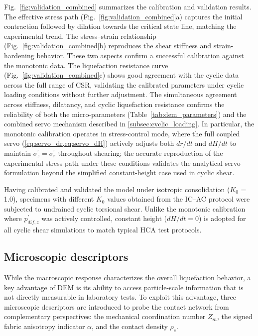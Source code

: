 \documentclass[a4paper,fleqn]{cas-sc}
\newcommand{\Kzero}{\ensuremath{K_0}}
\newcommand{\Zm}{\ensuremath{Z_m}}
\begin{document}
Fig.~\ref{fig:validation_combined} summarizes the calibration and validation results. The effective stress path (Fig.~\ref{fig:validation_combined}a) captures the initial contraction followed by dilation towards the critical state line, matching the experimental trend. The stress--strain relationship (Fig.~\ref{fig:validation_combined}b) reproduces the shear stiffness and strain-hardening behavior. These two aspects confirm a successful calibration against the monotonic data. The liquefaction resistance curve (Fig.~\ref{fig:validation_combined}c) shows good agreement with the cyclic data across the full range of CSR, validating the calibrated parameters under cyclic loading conditions without further adjustment. The simultaneous agreement across stiffness, dilatancy, and cyclic liquefaction resistance confirms the reliability of both the micro-parameters (Table~\ref{tab:dem_parameters}) and the combined servo mechanism described in \cref{subsec:cyclic_loading}. In particular, the monotonic calibration operates in stress-control mode, where the full coupled servo (\cref{eq:servo_dr,eq:servo_dH}) actively adjusts both $dr/dt$ and $dH/dt$ to maintain $\sigma_z^{\prime}=\sigma_r^{\prime}$ throughout shearing; the accurate reproduction of the experimental stress path under these conditions validates the analytical servo formulation beyond the simplified constant-height case used in cyclic shear.

Having calibrated and validated the model under isotropic consolidation (\Kzero{} = 1.0), specimens with different \Kzero{} values obtained from the IC--AC protocol were subjected to undrained cyclic torsional shear. Unlike the monotonic calibration where $p_{dif,z}^{\prime}$ was actively controlled, constant height ($dH/dt=0$) is adopted for all cyclic shear simulations to match typical HCA test protocols.

\subsection{Microscopic descriptors}
\label{subsec:micro_descriptors}

While the macroscopic response characterizes the overall liquefaction behavior, a key advantage of DEM is its ability to access particle-scale information that is not directly measurable in laboratory tests. To exploit this advantage, three microscopic descriptors are introduced to probe the contact network from complementary perspectives: the mechanical coordination number \Zm{}, the signed fabric anisotropy indicator $\alpha$, and the contact density $\rho_c$.
\end{document}
